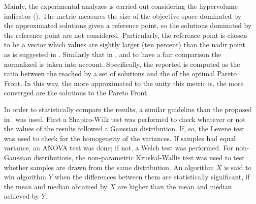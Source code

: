 Mainly, the experimental analyzes is carried out considering the hypervolume indicator (\HV{}).
%
The \HV{} metric measures the size of the objective space dominated by the approximated solutions given a reference point, so the solutions dominated by the reference point are not considered.
%
Particularly, the reference point is chosen to be a vector which values are sightly larger (ten percent) than the nadir point as is suggested in \cite{ishibuchi2017reference}.
%
Similarly that in \cite{li2015evolutionary}, and to have a fair comparison the normalized \HV{} is taken into account.
%
Specifically, the \HV{} reported is computed as the ratio between the \HV{} reached by a set of solutions and the \HV{} of the optimal Pareto Front.
%
In this way, the more approximated to the unity this metric is, the more converged are the solutions to the Pareto Front.
%



%
In order to statistically compare the \HV{} results, a similar guideline than the proposed in~\cite{Joel:StatisticalTest} was used. 
%
First a Shapiro-Wilk test was performed to check whatever or not the values of the results followed a Gaussian distribution. 
%
If, so, the Levene test was used to check for the homogeneity of the variances. 
%
If samples had equal variance, an ANOVA test was done; if not, a Welch test was performed. 
%
For non-Gaussian distributions, the non-parametric Kruskal-Wallis test was used to test whether samples are drawn from the same distribution. 
%
An algorithm $X$ is said to win algorithm $Y$ when the differences between them are statistically significant, if the mean and median obtained by $X$ are higher than the mean and median achieved by $Y$.
%

